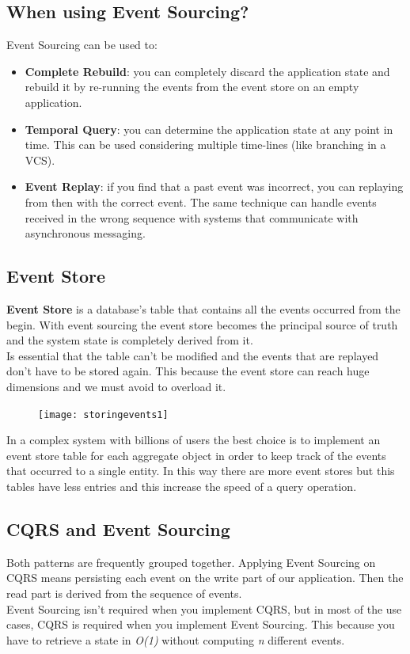 \documentclass[11pt]{article} %
\begin{document}
\subsection{When using Event Sourcing?}
Event Sourcing can be used to:
\begin{itemize}
	\item \textbf{Complete Rebuild}: you can completely discard the application state  and rebuild it by re-running the events from the event store on an empty application.
	\item \textbf{Temporal Query}: you can determine the application state at any point in time. This can be used considering multiple time-lines (like branching in a VCS).
	\item \textbf{Event Replay}: if you find that a past event was incorrect, you can replaying from then with the correct event. The same technique can handle events received in the wrong sequence with systems that communicate with asynchronous messaging.
\end{itemize}

\subsection{Event Store}
\textbf{Event Store} is a database's table that contains all the events occurred from the begin.
With event sourcing the event store becomes the principal source of truth and the system state is completely derived from it. \\
Is essential that the table can't be modified and the events that are replayed don't have to be stored again. 
This because the event store can reach huge dimensions and we must avoid to overload it.\\
\begin{figure} [H]
	\centering
	\texttt{[image: storingevents1]} \\
\end{figure}
In a complex system with billions of users the best choice is to implement an event store table for each aggregate object in order to keep track of the events that occurred to a single entity. In this way there are more event stores but this tables have less entries and this increase the speed of a query operation.

\subsection{CQRS and Event Sourcing}
Both patterns are frequently grouped together. Applying Event Sourcing on  CQRS means persisting each event on the write part of our application. Then the read part is derived from the sequence of events. \\
Event Sourcing isn't required when you implement CQRS, but in most of the use cases, CQRS is required when you implement Event Sourcing. This because you have to retrieve a state in \emph{O(1)} without computing \emph{n} different events.
\end{document}
